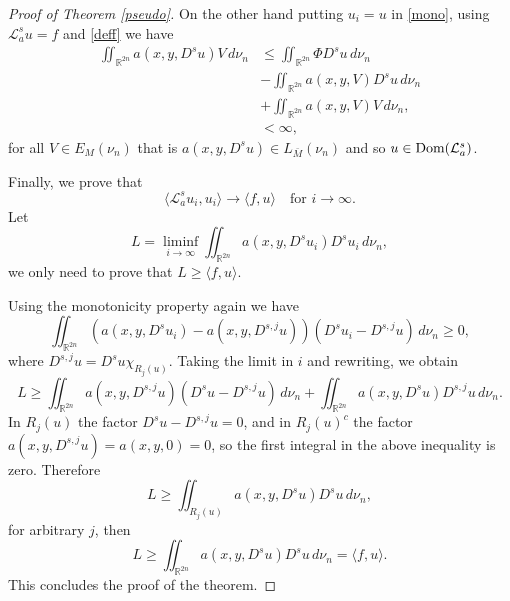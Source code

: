 \documentclass[10pt,a4paper]{amsart}
\def\Dom{\text{\normalfont Dom}}
\newcommand{\A}{\mathcal{L}_a^s}
\newcommand{\R}{{\mathbb R}}
\begin{document}
\begin{proof}[Proof of Theorem \ref{pseudo}]
On the other hand putting $u_i=u$ in \eqref{mono}, using $\A u=f$ and \eqref{deff} we have
\begin{align*}
\iint_{\R^{2n}} a(x,y,D^s u)V\,d\nu_n&\leq \iint_{\R^{2n}} \Phi D^s u\,d\nu_n
\\
&-\iint_{\R^{2n}} a(x,y,V)D^s u\,d\nu_n
\\
&+\iint_{\R^{2n}} a(x,y,V)V\,d\nu_n,
\\
&<\infty,
\end{align*}
for all $V\in E_M(\nu_n)$ that is $a(x,y,D^su)\in L_{\bar{M}}(\nu_n)$ and so $u\in \Dom(\A)$.

Finally, we prove that 
$$
\langle \A u_i, u_i \rangle \to \langle f, u \rangle \quad \text{for } i \to \infty.
$$
Let  
$$
L = \liminf_{i \to \infty} \iint_{\mathbb{R}^{2n}} a(x,y,D^s u_i) D^s u_i \, d\nu_n,
$$
we only need to prove that \( L \geq \langle f, u \rangle \). 

Using the monotonicity property again we have  
$$
\iint_{\mathbb{R}^{2n}} \left(a(x,y,D^s u_i) - a(x,y,D^{s,j}u) \right) (D^s u_i - D^{s,j}u) \, d\nu_n \geq 0,
$$
where $ D^{s,j}u = D^s u \chi_{R_j(u)}$. Taking the limit in \( i \) and rewriting, we obtain  
$$
L \geq \iint_{\mathbb{R}^{2n}} a(x,y,D^{s,j}u)(D^s u - D^{s,j}u) \, d\nu_n + \iint_{\mathbb{R}^{2n}} a(x,y,D^s u) D^{s,j}u \, d\nu_n.
$$
In $ R_j(u)$ the factor $D^s u - D^{s,j}u = 0$, and in $R_j(u)^c$ the factor $a(x,y,D^{s,j}u)=a(x,y,0)=0$, so the first integral in the above inequality is zero. Therefore  
$$
L \geq \iint_{R_j(u)}a(x,y,D^s u) D^s u \, d\nu_n,
$$
for arbitrary $j$, then  
$$
L \geq \iint_{\mathbb{R}^{2n}}a(x,y,D^s u) D^s u \, d\nu_n = \langle f, u \rangle.
$$
This concludes the proof of the theorem.
\end{proof}
\end{document}
